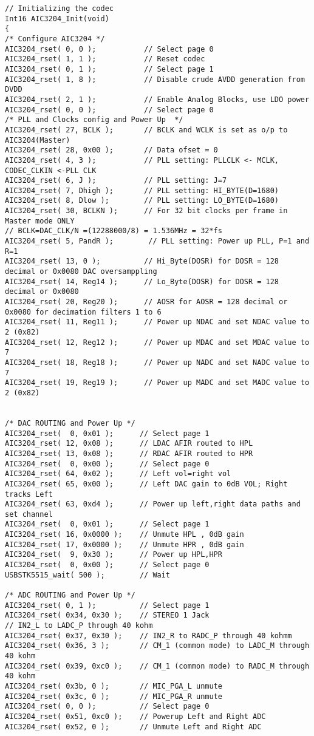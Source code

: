 \begin{lstlisting}
// Initializing the codec
Int16 AIC3204_Init(void)
{	
/* Configure AIC3204 */
AIC3204_rset( 0, 0 );           // Select page 0
AIC3204_rset( 1, 1 );           // Reset codec
AIC3204_rset( 0, 1 );           // Select page 1
AIC3204_rset( 1, 8 );           // Disable crude AVDD generation from DVDD
AIC3204_rset( 2, 1 );           // Enable Analog Blocks, use LDO power
AIC3204_rset( 0, 0 );           // Select page 0
/* PLL and Clocks config and Power Up  */
AIC3204_rset( 27, BCLK );       // BCLK and WCLK is set as o/p to AIC3204(Master)
AIC3204_rset( 28, 0x00 );       // Data ofset = 0
AIC3204_rset( 4, 3 );           // PLL setting: PLLCLK <- MCLK, CODEC_CLKIN <-PLL CLK
AIC3204_rset( 6, J );           // PLL setting: J=7
AIC3204_rset( 7, Dhigh );       // PLL setting: HI_BYTE(D=1680)
AIC3204_rset( 8, Dlow );        // PLL setting: LO_BYTE(D=1680)
AIC3204_rset( 30, BCLKN );      // For 32 bit clocks per frame in Master mode ONLY
// BCLK=DAC_CLK/N =(12288000/8) = 1.536MHz = 32*fs
AIC3204_rset( 5, PandR );        // PLL setting: Power up PLL, P=1 and R=1
AIC3204_rset( 13, 0 );          // Hi_Byte(DOSR) for DOSR = 128 decimal or 0x0080 DAC oversamppling
AIC3204_rset( 14, Reg14 );      // Lo_Byte(DOSR) for DOSR = 128 decimal or 0x0080
AIC3204_rset( 20, Reg20 );      // AOSR for AOSR = 128 decimal or 0x0080 for decimation filters 1 to 6
AIC3204_rset( 11, Reg11 );      // Power up NDAC and set NDAC value to 2 (0x82)
AIC3204_rset( 12, Reg12 );      // Power up MDAC and set MDAC value to 7
AIC3204_rset( 18, Reg18 );      // Power up NADC and set NADC value to 7
AIC3204_rset( 19, Reg19 );      // Power up MADC and set MADC value to 2 (0x82)


/* DAC ROUTING and Power Up */
AIC3204_rset(  0, 0x01 );      // Select page 1
AIC3204_rset( 12, 0x08 );      // LDAC AFIR routed to HPL
AIC3204_rset( 13, 0x08 );      // RDAC AFIR routed to HPR
AIC3204_rset(  0, 0x00 );      // Select page 0
AIC3204_rset( 64, 0x02 );      // Left vol=right vol
AIC3204_rset( 65, 0x00 );      // Left DAC gain to 0dB VOL; Right tracks Left
AIC3204_rset( 63, 0xd4 );      // Power up left,right data paths and set channel
AIC3204_rset(  0, 0x01 );      // Select page 1
AIC3204_rset( 16, 0x0000 );    // Unmute HPL , 0dB gain
AIC3204_rset( 17, 0x0000 );    // Unmute HPR , 0dB gain
AIC3204_rset(  9, 0x30 );      // Power up HPL,HPR
AIC3204_rset(  0, 0x00 );      // Select page 0
USBSTK5515_wait( 500 );        // Wait

/* ADC ROUTING and Power Up */
AIC3204_rset( 0, 1 );          // Select page 1
AIC3204_rset( 0x34, 0x30 );    // STEREO 1 Jack
// IN2_L to LADC_P through 40 kohm
AIC3204_rset( 0x37, 0x30 );    // IN2_R to RADC_P through 40 kohmm
AIC3204_rset( 0x36, 3 );       // CM_1 (common mode) to LADC_M through 40 kohm
AIC3204_rset( 0x39, 0xc0 );    // CM_1 (common mode) to RADC_M through 40 kohm
AIC3204_rset( 0x3b, 0 );       // MIC_PGA_L unmute
AIC3204_rset( 0x3c, 0 );       // MIC_PGA_R unmute
AIC3204_rset( 0, 0 );          // Select page 0
AIC3204_rset( 0x51, 0xc0 );    // Powerup Left and Right ADC
AIC3204_rset( 0x52, 0 );       // Unmute Left and Right ADC


\end{lstlisting}
